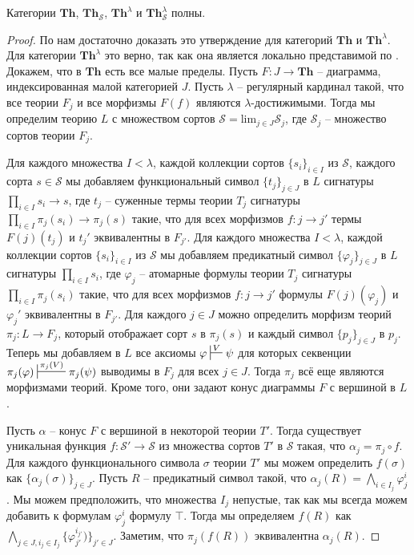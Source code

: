 \documentclass[reqno]{amsart}
\theoremstyle{definition}
\theoremstyle{remark}
\newcommand{\bcat}[1]{\mathbf{#1}}
\newcommand{\fs}[1]{\mathrm{#1}}
\newcommand{\Th}{\bcat{Th}}
\begin{document}
\begin{prop}[th-limits]
Категории $\Th$, $\Th_\mathcal{S}$, $\Th^\lambda$ и $\Th_\mathcal{S}^\lambda$ полны.
\end{prop}
\begin{proof}
По  нам достаточно доказать это утверждение для категорий $\Th$ и $\Th^\lambda$.
Для категории $\Th^\lambda$ это верно, так как она является локально представимой по .
Докажем, что в $\Th$ есть все малые пределы.
Пусть $F : J \to \Th$ -- диаграмма, индексированная малой категорией $J$.
Пусть $\lambda$ -- регулярный кардинал такой, что все теории $F_j$ и все морфизмы $F(f)$ являются $\lambda$-достижимыми.
Тогда мы определим теорию $L$ с множеством сортов $\mathcal{S} = \fs{lim}_{j \in J} \mathcal{S}_j$, где $\mathcal{S}_j$ -- множество сортов теории $F_j$.

Для каждого множества $I < \lambda$, каждой коллекции сортов $\{ s_i \}_{i \in I}$ из $\mathcal{S}$, каждого сорта $s \in \mathcal{S}$ мы добавляем функциональный символ $\{ t_j \}_{j \in J}$ в $L$ сигнатуры $\prod_{i \in I} s_i \to s$,
где $t_j$ -- суженные термы теории $T_j$ сигнатуры $\prod_{i \in I} \pi_j(s_i) \to \pi_j(s)$ такие, что для всех морфизмов $f : j \to j'$ термы $F(j)(t_j)$ и $t_j'$ эквивалентны в $F_{j'}$.
Для каждого множества $I < \lambda$, каждой коллекции сортов $\{ s_i \}_{i \in I}$ из $\mathcal{S}$ мы добавляем предикатный символ $\{ \varphi_j \}_{j \in J}$ в $L$ сигнатуры $\prod_{i \in I} s_i$,
где $\varphi_j$ -- атомарные формулы теории $T_j$ сигнатуры $\prod_{i \in I} \pi_j(s_i)$ такие, что для всех морфизмов $f : j \to j'$ формулы $F(j)(\varphi_j)$ и $\varphi_j'$ эквивалентны в $F_{j'}$.
Для каждого $j \in J$ можно определить морфизм теорий $\pi_j : L \to F_j$, который отображает сорт $s$ в $\pi_j(s)$ и каждый символ $\{ p_j \}_{j \in J}$ в $p_j$.
Теперь мы добавляем в $L$ все аксиомы $\varphi \sststile{}{V} \psi$ для которых секвенции $\pi_j(\varphi) \sststile{}{\pi_j(V)} \pi_j(\psi)$ выводимы в $F_j$ для всех $j \in J$.
Тогда $\pi_j$ всё еще являются морфизмами теорий.
Кроме того, они задают конус диаграммы $F$ с вершиной в $L$.

Пусть $\alpha$ -- конус $F$ с вершиной в некоторой теории $T'$.
Тогда существует уникальная функция $f : \mathcal{S}' \to \mathcal{S}$ из множества сортов $T'$ в $\mathcal{S}$ такая, что $\alpha_j = \pi_j \circ f$.
Для каждого функционального символа $\sigma$ теории $T'$ мы можем определить $f(\sigma)$ как $\{ \alpha_j(\sigma) \}_{j \in J}$.
Пусть $R$ -- предикатный символ такой, что $\alpha_j(R) = \bigwedge_{i \in I_j} \varphi^i_j$.
Мы можем предположить, что множества $I_j$ непустые, так как мы всегда можем добавить к формулам $\varphi^i_j$ формулу $\top$.
Тогда мы определяем $f(R)$ как $\bigwedge_{j \in J, i_j \in I_j} \{ \varphi^{i_{j'}}_{j'}) \}_{j' \in J}$.
Заметим, что $\pi_j(f(R))$ эквивалентна $\alpha_j(R)$.


\end{proof}
\end{document}
